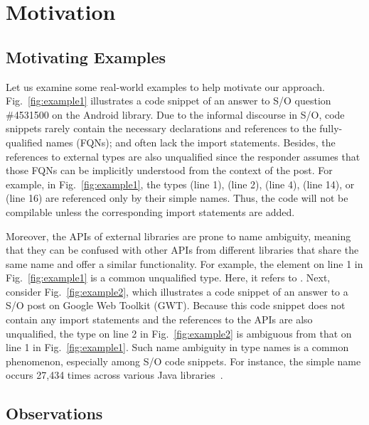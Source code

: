 \section{Motivation}
\label{motiv:sec}

\subsection{Motivating Examples}
\label{examples:sec}



Let us examine some real-world examples to help motivate our approach. Fig.~\ref{fig:example1} illustrates a code snippet of an answer to S/O question \#4531500 on the Android library. Due to the informal discourse in S/O, code snippets rarely contain the necessary declarations and references to the fully-qualified names (FQNs); and often lack the import statements. Besides, the references to external types are also unqualified since the responder assumes that those FQNs can be implicitly understood from the context of the post. For example, in Fig.~\ref{fig:example1}, the types  (line 1),  (line 2),  (line 4),  (line 14), or  (line 16) are referenced only by their simple names. Thus, the code will not be compilable unless the corresponding import statements are added.



Moreover, the APIs of external libraries are prone to name ambiguity, meaning that they can be confused with other APIs from different libraries that share the same name and offer a similar functionality. For example, the element  on line 1 in Fig.~\ref{fig:example1} is a common unqualified type. Here, it refers to . Next, consider Fig.~\ref{fig:example2}, which illustrates a code snippet of an answer to a S/O post on Google Web Toolkit (GWT). Because this code snippet does not contain any import statements and the references to the APIs are also unqualified, the type  on line 2 in Fig.~\ref{fig:example2} is ambiguous from that on line 1 in Fig.~\ref{fig:example1}. Such name ambiguity in type names is a common phenomenon, especially among S/O code snippets. For instance, the simple name  occurs 27,434 times across various Java libraries~\cite{liveapi14}.

\subsection{Observations}
\label{sec:obs}


